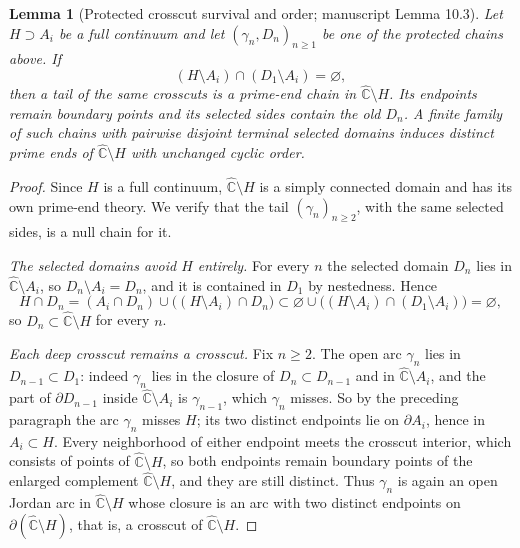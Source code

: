 \documentclass[11pt,reqno]{amsart}
\newtheorem{lemma}[theorem]{Lemma}
\theoremstyle{definition}
\theoremstyle{remark}
\newcommand{\Chat}{\widehat{\mathbb C}}
\begin{document}
\begin{lemma}[Protected crosscut survival and order; manuscript
Lemma 10.3]\label{lem:crosscut-survival}
Let $H\supset A_i$ be a full continuum and let $(\gamma_n,D_n)_{n\ge1}$ be
one of the protected chains above.  If
\[
(H\setminus A_i)\cap(D_1\setminus A_i)=\varnothing,
\]
then a tail of the same crosscuts is a prime-end chain in
$\Chat\setminus H$.  Its endpoints remain boundary points and its selected
sides contain the old $D_n$.  A finite family of such chains with pairwise
disjoint terminal selected domains induces distinct prime ends of
$\Chat\setminus H$ with unchanged cyclic order.
\end{lemma}

\begin{proof}
Since $H$ is a full continuum, $\Chat\setminus H$ is a simply connected
domain and has its own prime-end theory.  We verify that the tail
$(\gamma_n)_{n\ge2}$, with the same selected sides, is a null chain for
it.

\emph{The selected domains avoid $H$ entirely.}
For every $n$ the selected domain $D_n$ lies in $\Chat\setminus A_i$, so
$D_n\setminus A_i=D_n$, and it is contained in $D_1$ by nestedness.
Hence
\[
H\cap D_n
=(A_i\cap D_n)\cup\bigl((H\setminus A_i)\cap D_n\bigr)
\subset\varnothing\cup\bigl((H\setminus A_i)\cap(D_1\setminus A_i)\bigr)
=\varnothing,
\]
so $D_n\subset\Chat\setminus H$ for every $n$.

\emph{Each deep crosscut remains a crosscut.}
Fix $n\ge2$.  The open arc $\gamma_n$ lies in $D_{n-1}\subset D_1$:
indeed $\gamma_n$ lies in the closure of $D_n\subset D_{n-1}$ and in
$\Chat\setminus A_i$, and the part of $\partial D_{n-1}$ inside
$\Chat\setminus A_i$ is $\gamma_{n-1}$, which $\gamma_n$ misses.  So by
the preceding paragraph the arc $\gamma_n$ misses $H$; its two distinct
endpoints lie on $\partial A_i$, hence in $A_i\subset H$.  Every
neighborhood of either endpoint meets the crosscut interior, which
consists of points of $\Chat\setminus H$, so both endpoints remain
boundary points of the enlarged complement $\Chat\setminus H$, and they
are still distinct.  Thus $\gamma_n$ is again an open Jordan arc in
$\Chat\setminus H$ whose closure is an arc with two distinct endpoints on
$\partial(\Chat\setminus H)$, that is, a crosscut of $\Chat\setminus H$.


\end{proof}
\end{document}
